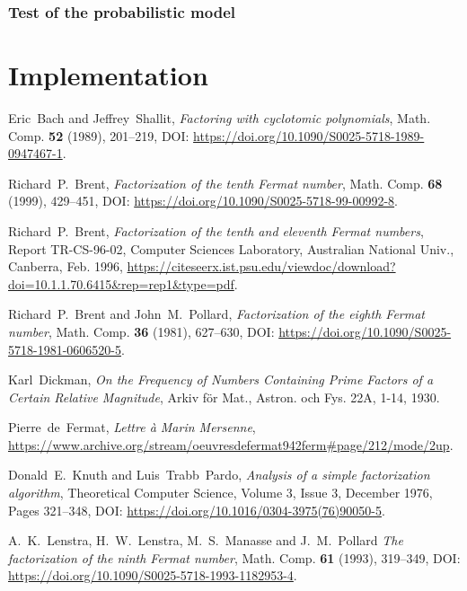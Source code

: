 \documentclass[a4paper, 11pt, pdftex]{report}
\theoremstyle{plain}
\theoremstyle{definition}
\begin{document}
\subsection{Test of the probabilistic model}



\chapter{Implementation}

\begin{thebibliography}{99}

 Eric~Bach and Jeffrey~Shallit, \emph{Factoring with cyclotomic polynomials},
Math. Comp. \textbf{52} (1989), 201--219, DOI: \url{https://doi.org/10.1090/S0025-5718-1989-0947467-1}.

 Richard~P.~Brent, \emph{Factorization of the tenth Fermat number}, Math. Comp.
\textbf{68} (1999), 429--451, DOI: \url{https://doi.org/10.1090/S0025-5718-99-00992-8}.

 Richard~P.~Brent, \emph{Factorization of the tenth and eleventh Fermat numbers},
Report TR-CS-96-02, Computer Sciences Laboratory, Australian National Univ., Canberra, Feb. 1996,
\url{https://citeseerx.ist.psu.edu/viewdoc/download?doi=10.1.1.70.6415&rep=rep1&type=pdf}.

 Richard~P.~Brent and John~M.~Pollard, \emph{Factorization of the eighth
Fermat number}, Math. Comp. \textbf{36} (1981), 627--630, DOI:
\url{https://doi.org/10.1090/S0025-5718-1981-0606520-5}.

 Karl~Dickman, \emph{On the Frequency of Numbers Containing Prime Factors
of a Certain Relative Magnitude}, Arkiv för Mat., Astron. och Fys. 22A, 1-14, 1930. 

 Pierre~de~Fermat, \emph{Lettre à Marin Mersenne},
\url{https://www.archive.org/stream/oeuvresdefermat942ferm#page/212/mode/2up}.

 Donald~E.~Knuth and Luis~Trabb~Pardo, \emph{Analysis of a simple
factorization algorithm}, Theoretical Computer Science, Volume 3, Issue 3, December 1976,
Pages 321--348, DOI: \url{https://doi.org/10.1016/0304-3975(76)90050-5}.

 A.~K.~Lenstra, H.~W.~Lenstra, M.~S.~Manasse and J.~M.~Pollard
\emph{The factorization of the ninth Fermat number}, Math. Comp. \textbf{61} (1993), 319--349,
DOI: \url{https://doi.org/10.1090/S0025-5718-1993-1182953-4}.


\end{thebibliography}
\end{document}
